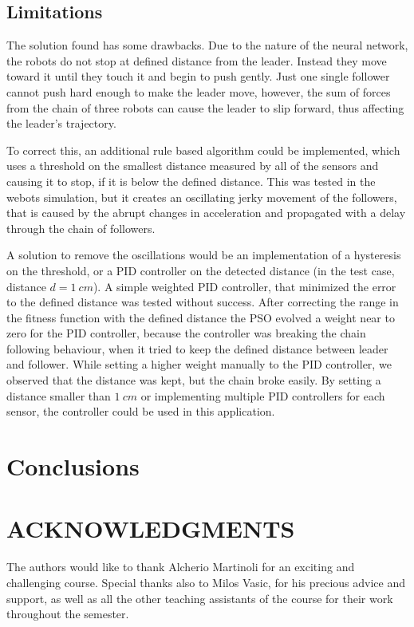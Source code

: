 \documentclass[a4paper, 10pt, conference]{ieeeconf}      %
\begin{document}
\subsection{Limitations}
The solution found has some drawbacks. Due to the nature of the neural network, the robots do not stop at defined distance from the leader. Instead they move toward it until they touch it and begin to push gently. Just one single follower cannot push hard enough to make the leader move, however, the sum of forces from the chain of three robots can cause the leader to slip forward, thus affecting the leader's trajectory.

To correct this, an additional rule based algorithm could be implemented, which uses a threshold on the smallest distance measured by all of the sensors and causing it to stop, if it is below the defined distance. This was tested in the webots simulation, but it creates an oscillating jerky movement of the followers, that is caused by the abrupt changes in acceleration and propagated with a delay through the chain of followers. 

A solution to remove the oscillations would be an implementation of a hysteresis on the threshold, or a PID controller on the detected distance (in the test case, distance $d=1 \:cm$). A simple weighted PID controller, that minimized the error to the defined distance was tested without success. After correcting the range in the fitness function with the defined distance the PSO evolved a weight near to zero for the PID controller, because the controller was breaking the chain following behaviour, when it tried to keep the defined distance between leader and follower. While setting a higher weight manually to the PID controller, we observed that the distance was kept, but the chain broke easily. By setting a distance smaller than $1 \:cm$ or implementing multiple PID controllers for each sensor, the controller could be used in this application.


\section{Conclusions}

\section{ACKNOWLEDGMENTS}
The authors would like to thank Alcherio Martinoli for an exciting and challenging course. Special thanks also to Milos Vasic, for his precious advice and support, as well as all the other teaching assistants of the course for their work throughout the semester.
\end{document}
